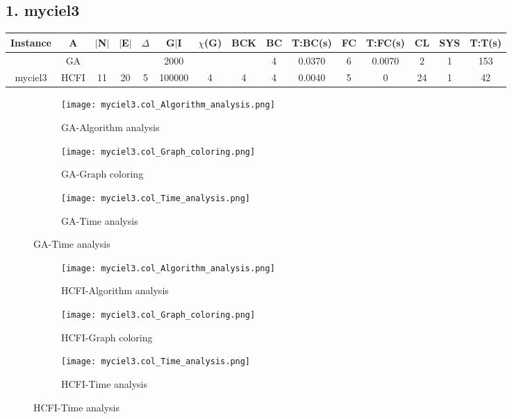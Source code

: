 \documentclass[10pt]{article}
\begin{document}
\subsection*{\hspace{0,9073976cm} 1. myciel3}
\begin{table}[H]
\centering
\begin{tabular}{|c|c|c|c|c|c|c|c|c|c|c|c|c|c|c|}
\hline
Instance& A &$|$N$|$ & $|$E$|$ & $\Delta$ & G$|$I & $\chi$(G) &BCK&BC & T:BC(s) & FC & T:FC(s) & CL & SYS & T:T(s) \\ \hline \hline

	&GA&       &                   &                     &2000         &     \cellcolor{yellow} & {\cellcolor{yellow}}& {{\cellcolor{green}4}}
&0.0370   &6        &0.0070                   &2                   &1          &153        \\ \cline{2-2} \cline{6-6} \cline{9-15}
 \multirow{-2}{*}{myciel3} &HCFI   &\multirow{-2}{*}{11}   &\multirow{-2}{*}{20}     &\multirow{-2}{*}{5}     &100000     &\multirow{-2}{*}{\cellcolor{yellow}4}      & \multirow{-2}{*}{\cellcolor{yellow}4}    &{\cellcolor{green}4}     &0.0040          &5    &0         &24    &1     &       42 \\ \hline 

\end{tabular}
\end{table}
\graphicspath{{./Core1/Solutions/GA/myciel3.col}}
\begin{figure}[H]
\begin{subfigure}{.33\textwidth}
  \centering
  \texttt{[image: myciel3.col\_Algorithm\_analysis.png]}
  \caption{GA-Algorithm analysis}
   \label{fig:subfig1}
\end{subfigure}%
\begin{subfigure}{.33\textwidth}
  \centering
  \texttt{[image: myciel3.col\_Graph\_coloring.png]}
  \caption{GA-Graph coloring}
  \label{fig:subfig2}
\end{subfigure}
\begin{subfigure}{.33\textwidth}
  \centering
  \texttt{[image: myciel3.col\_Time\_analysis.png]}
  \caption{GA-Time analysis}
  \end{subfigure}
\end{figure}
\graphicspath{{./Core1/Solutions/HCFI/myciel3.col}}
\begin{figure}[H]
\centering
\begin{subfigure}{.33\textwidth}
  \centering
  \texttt{[image: myciel3.col\_Algorithm\_analysis.png]}
  \caption{HCFI-Algorithm analysis}
   \label{fig:subfig1}
\end{subfigure}%
\begin{subfigure}{.33\textwidth}
  \centering
  \texttt{[image: myciel3.col\_Graph\_coloring.png]}
  \caption{HCFI-Graph coloring}
  \label{fig:subfig2}
\end{subfigure}
\begin{subfigure}{.33\textwidth}
  \centering
  \texttt{[image: myciel3.col\_Time\_analysis.png]}
  \caption{HCFI-Time analysis}
  \label{fig:subfig2}
\end{subfigure}
\end{figure}
\end{document}
